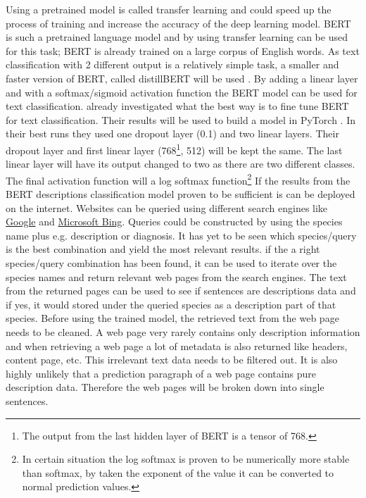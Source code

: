 \documentclass{article}
\begin{document}
Using a pretrained model is called transfer learning and could speed up the process of training and increase the accuracy of the deep learning model.
BERT \cite{devlin_bert_2019} is such a pretrained language model and by using transfer learning can be used for this task; BERT is already trained on a large corpus of English words.
As text classification with 2 different output is a relatively simple task, a smaller and faster version of BERT, called distillBERT will be used \cite{sanh_distilbert_2020}.
By adding a linear layer and with a softmax/sigmoid activation function the BERT model can be used for text classification.
\cite{sun_how_2020} already investigated what the best way is to fine tune BERT for text classification. 
Their results will be used to build a model in PyTorch \cite{paszke_pytorch_2019}.
In their best runs they used one dropout layer (0.1) and two linear layers. 
Their dropout layer and first linear layer (768\footnote{The output from the last hidden layer of BERT is a tensor of 768.}, 512) will be kept the same.
The last linear layer will have its output changed to two as there are two different classes.
The final activation function will a log softmax function\footnote{In certain situation the log softmax is proven to be numerically more stable than softmax, by taken the exponent of the value it can be converted to normal prediction values.}
If the results from the BERT descriptions classification model proven to be sufficient is can be deployed on the internet.
Websites can be queried using different search engines like \href{www.google.com}{Google} and \href{www.bing.com}{Microsoft Bing}.
Queries could be constructed by using the species name plus e.g. description or diagnosis. 
It has yet to be seen which species/query is the best combination and yield the most relevant results.
if the a right species/query combination has been found, it can be used to iterate over the species names and return relevant web pages from the search engines.
The text from the returned pages can be used to see if sentences are descriptions data and if yes, it would stored under the queried species as a description part of that species.
Before using the trained model, the retrieved text from the web page needs to be cleaned.
A web page very rarely contains only description information and when retrieving a web page a lot of metadata is also returned like headers, content page, etc.
This irrelevant text data needs to be filtered out. 
It is also highly unlikely that a prediction paragraph of a web page contains pure description data.
Therefore the web pages will be broken down into single sentences.
\end{document}
